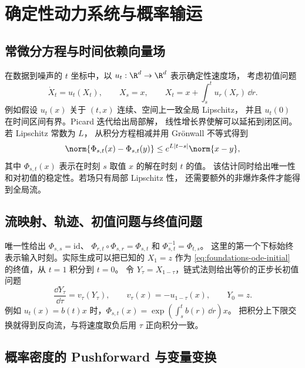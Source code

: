 \section{确定性动力系统与概率输运}

\subsection{常微分方程与时间依赖向量场}

在数据到噪声的 \(t\) 坐标中，以 \(u_t:\R^d\to\R^d\) 表示确定性速度场，
考虑初值问题
\begin{equation}
  \dot X_t=u_t(X_t),\qquad X_s=x,\qquad
  X_t=x+\int_s^t u_r(X_r)\,\dd r .
  \label{eq:foundations-ode-initial}
\end{equation}
例如假设 \(u_t(x)\) 关于 \((t,x)\) 连续、空间上一致全局 Lipschitz，
并且 \(u_t(0)\) 在时间区间有界。Picard 迭代给出局部解，
线性增长界使解可以延拓到闭区间。若 Lipschitz 常数为 \(L\)，
从积分方程相减并用 Grönwall 不等式得到
\[
  \norm{\Phi_{s,t}(x)-\Phi_{s,t}(y)}
    \le e^{L|t-s|}\norm{x-y},
\]
其中 \(\Phi_{s,t}(x)\) 表示在时刻 \(s\) 取值 \(x\) 的解在时刻 \(t\) 的值。
该估计同时给出唯一性和对初值的稳定性。若场只有局部 Lipschitz 性，
还需要额外的非爆炸条件才能得到全局流。

\subsection{流映射、轨迹、初值问题与终值问题}

唯一性给出
\(\Phi_{s,s}=\mathrm{id}\)、
\(\Phi_{r,t}\circ\Phi_{s,r}=\Phi_{s,t}\) 和 \(\Phi_{s,t}^{-1}=\Phi_{t,s}\)。
这里的第一个下标始终表示输入时刻。实际生成可以把已知的 \(X_1=z\) 作为
\eqref{eq:foundations-ode-initial} 的终值，从 \(t=1\) 积分到 \(t=0\)。
令 \(Y_\tau=X_{1-\tau}\)，链式法则给出等价的正步长初值问题
\begin{equation}
  \frac{\dd Y_\tau}{\dd\tau}=v_\tau(Y_\tau),\qquad
  v_\tau(x)=-u_{1-\tau}(x),\qquad Y_0=z .
  \label{eq:foundations-velocity-reversal}
\end{equation}
例如 \(u_t(x)=b(t)x\) 时，\(\Phi_{s,t}(x)=\exp(\int_s^t b(r)\,\dd r)x\)。
把积分上下限交换就得到反向流，与将速度取负后用 \(\tau\) 正向积分一致。

\subsection{概率密度的 Pushforward 与变量变换}


